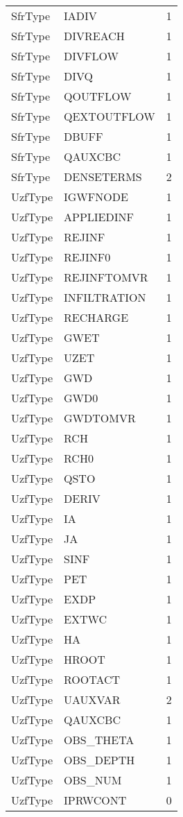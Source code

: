 \begin{longtable}{p{6cm} p{4cm} p{2cm} }
SfrType &  IADIV & 1 \\ 
SfrType &  DIVREACH & 1 \\ 
SfrType &  DIVFLOW & 1 \\ 
SfrType &  DIVQ & 1 \\ 
SfrType &  QOUTFLOW & 1 \\ 
SfrType &  QEXTOUTFLOW & 1 \\ 
SfrType &  DBUFF & 1 \\ 
SfrType &  QAUXCBC & 1 \\ 
SfrType &  DENSETERMS & 2 \\ 
UzfType &  IGWFNODE & 1 \\ 
UzfType &  APPLIEDINF & 1 \\ 
UzfType &  REJINF & 1 \\ 
UzfType &  REJINF0 & 1 \\ 
UzfType &  REJINFTOMVR & 1 \\ 
UzfType &  INFILTRATION & 1 \\ 
UzfType &  RECHARGE & 1 \\ 
UzfType &  GWET & 1 \\ 
UzfType &  UZET & 1 \\ 
UzfType &  GWD & 1 \\ 
UzfType &  GWD0 & 1 \\ 
UzfType &  GWDTOMVR & 1 \\ 
UzfType &  RCH & 1 \\ 
UzfType &  RCH0 & 1 \\ 
UzfType &  QSTO & 1 \\ 
UzfType &  DERIV & 1 \\ 
UzfType &  IA & 1 \\ 
UzfType &  JA & 1 \\ 
UzfType &  SINF & 1 \\ 
UzfType &  PET & 1 \\ 
UzfType &  EXDP & 1 \\ 
UzfType &  EXTWC & 1 \\ 
UzfType &  HA & 1 \\ 
UzfType &  HROOT & 1 \\ 
UzfType &  ROOTACT & 1 \\ 
UzfType &  UAUXVAR & 2 \\ 
UzfType &  QAUXCBC & 1 \\ 
UzfType &  OBS\_THETA & 1 \\ 
UzfType &  OBS\_DEPTH & 1 \\ 
UzfType &  OBS\_NUM & 1 \\ 
UzfType &  IPRWCONT & 0 \\ 

\end{longtable}
